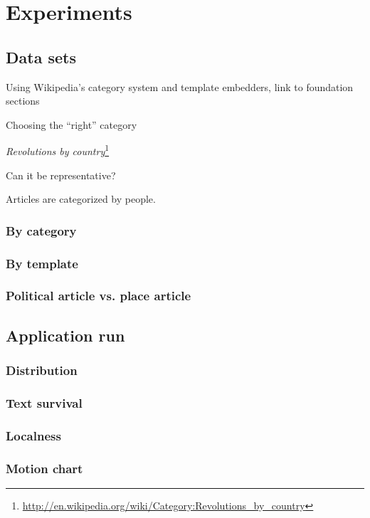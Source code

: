 \chapter{Experiments}\label{ch:experiment}

\section{Data sets}

\begin{todos}
	\item Using Wikipedia's category system and template embedders, link to foundation sections
    \item Choosing the ``right'' category 
    \item \emph{Revolutions by country}\footnote{\url{http://en.wikipedia.org/wiki/Category:Revolutions_by_country}}
    \item Can it be representative?
    \item Articles are categorized by people.
\end{todos}


\subsection{By category}

\subsection{By template}

\subsection{Political article vs. place article}



\section{Application run}


\subsection{Distribution}

\subsection{Text survival}

\subsection{Localness}

\subsection{Motion chart}
